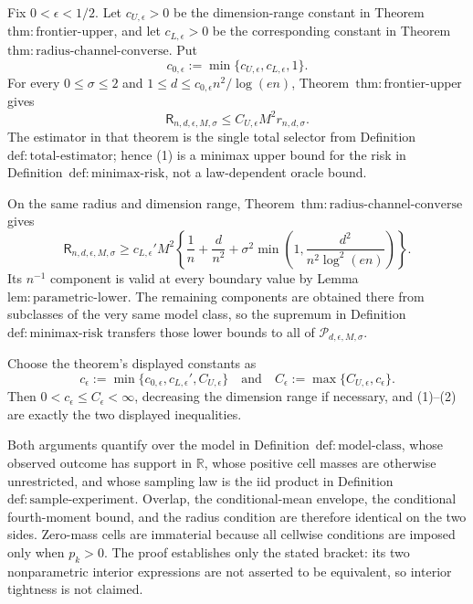 Fix \(0<\epsilon<1/2\).  Let \(c_{U,\epsilon}>0\) be the dimension-range constant in Theorem~\(\mathrm{thm:frontier\text{-}upper}\), and let \(c_{L,\epsilon}>0\) be the corresponding constant in Theorem~\(\mathrm{thm:radius\text{-}channel\text{-}converse}\).  Put
\[
 c_{0,\epsilon}:=\min\{c_{U,\epsilon},c_{L,\epsilon},1\}.
\]
For every \(0\le\sigma\le2\) and \(1\le d\le c_{0,\epsilon}n^2/\log(en)\), Theorem~\(\mathrm{thm:frontier\text{-}upper}\) gives
\[
 \mathsf R_{n,d,\epsilon,M,\sigma}
 \le C_{U,\epsilon}M^2r_{n,d,\sigma}.
\tag{1}
\]
The estimator in that theorem is the single total selector from Definition~\(\mathrm{def:total\text{-}estimator}\); hence (1) is a minimax upper bound for the risk in Definition~\(\mathrm{def:minimax\text{-}risk}\), not a law-dependent oracle bound.

On the same radius and dimension range, Theorem~\(\mathrm{thm:radius\text{-}channel\text{-}converse}\) gives
\[
 \mathsf R_{n,d,\epsilon,M,\sigma}
 \ge c_{L,\epsilon}'M^2\left\{
 \frac1n+\frac d{n^2}
 +\sigma^2\min\left(1,\frac{d^2}{n^2\log^2(en)}\right)
 \right\}.
\tag{2}
\]
Its \(n^{-1}\) component is valid at every boundary value by Lemma~\(\mathrm{lem:parametric\text{-}lower}\).  The remaining components are obtained there from subclasses of the very same model class, so the supremum in Definition~\(\mathrm{def:minimax\text{-}risk}\) transfers those lower bounds to all of \(\mathcal P_{d,\epsilon,M,\sigma}\).

Choose the theorem's displayed constants as
\[
 c_{\epsilon}:=\min\{c_{0,\epsilon},c_{L,\epsilon}',C_{U,\epsilon}\}
 \quad\text{and}\quad
 C_{\epsilon}:=\max\{C_{U,\epsilon},c_{\epsilon}\}.
\]
Then \(0<c_{\epsilon}\le C_{\epsilon}<\infty\), decreasing the dimension range if necessary, and (1)--(2) are exactly the two displayed inequalities.

Both arguments quantify over the model in Definition~\(\mathrm{def:model\text{-}class}\), whose observed outcome has support in \(\mathbb R\), whose positive cell masses are otherwise unrestricted, and whose sampling law is the iid product in Definition~\(\mathrm{def:sample\text{-}experiment}\).  Overlap, the conditional-mean envelope, the conditional fourth-moment bound, and the radius condition are therefore identical on the two sides.  Zero-mass cells are immaterial because all cellwise conditions are imposed only when \(p_k>0\).  The proof establishes only the stated bracket: its two nonparametric interior expressions are not asserted to be equivalent, so interior tightness is not claimed.